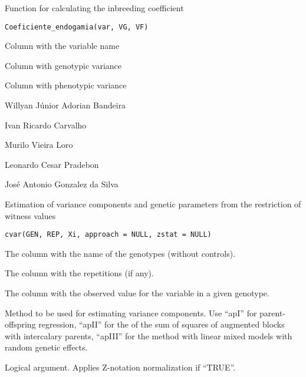 \documentclass[a4paper]{book}
\begin{document}
%
\begin{Description}
Function for calculating the inbreeding coefficient
\end{Description}
%
\begin{Usage}
\begin{verbatim}
Coeficiente_endogamia(var, VG, VF)
\end{verbatim}
\end{Usage}
%
\begin{Arguments}
\begin{ldescription}
\item[\code{var}] Column with the variable name

\item[\code{VG}] Column with genotypic variance

\item[\code{VF}] Column with phenotypic variance
\end{ldescription}
\end{Arguments}
%
\begin{Author}
Willyan Júnior Adorian Bandeira

Ivan Ricardo Carvalho

Murilo Vieira Loro

Leonardo Cesar Pradebon

José Antonio Gonzalez da Silva
\end{Author}
%
\begin{Description}
Estimation of variance components and genetic parameters from the restriction
of witness values
\end{Description}
%
\begin{Usage}
\begin{verbatim}
cvar(GEN, REP, Xi, approach = NULL, zstat = NULL)
\end{verbatim}
\end{Usage}
%
\begin{Arguments}
\begin{ldescription}
\item[\code{GEN}] The column with the name of the genotypes (without controls).

\item[\code{REP}] The column with the repetitions (if any).

\item[\code{Xi}] The column with the observed value for the variable in a given genotype.

\item[\code{approach}] Method to be used for estimating variance components. Use “apI”
for parent-offspring regression, “apII” for the of the sum of squares of
augmented blocks with intercalary parents, “apIII” for the method with linear
mixed models with random genetic effects.

\item[\code{zstat}] Logical argument. Applies Z-notation normalization if “TRUE”.
\end{ldescription}
\end{Arguments}
\end{document}

